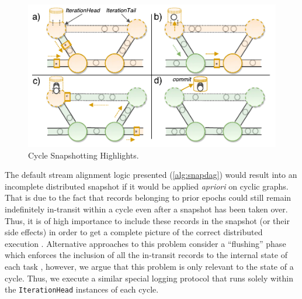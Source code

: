\begin{figure}[t]
\centering
\includegraphics[width=\textwidth / 2]{figures/cycle-highlights.pdf}
\caption{Cycle Snapshotting Highlights.} 
\label{fig:cycle-highlights}
\vspace{-4mm}
\end{figure}

The default stream alignment logic presented (\autoref{alg:snapdag}) would result into an incomplete distributed snapshot if it would be applied \emph{apriori} on cyclic graphs. That is due to the fact that records belonging to prior epochs could still remain indefinitely in-transit within a cycle even after a snapshot has been taken over. Thus, it is of high importance to include these records in the snapshot (or their side effects) in order to get a complete picture of the correct distributed execution \cite{chandy1985distributed,elnozahy2002survey}. Alternative approaches to this problem consider a ``flushing'' phase which enforces the inclusion of all the in-transit records to the internal state of each task \cite{jacques2016consistent}, however, we argue that this problem is only relevant to the state of a cycle. Thus, we execute a similar special logging protocol that runs solely within the \texttt{IterationHead} instances of each cycle.

